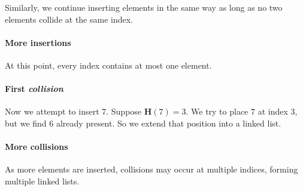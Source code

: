 \documentclass[11pt,openany]{book}
\begin{document}
Similarly, we continue inserting elements in the same way as long as no two elements collide at the same index.

\paragraph{More insertions}

\begin{center}
\end{center}

At this point, every index contains at most one element.

\paragraph{First \emph{collision}}

Now we attempt to insert \(7\). Suppose $\mathbf{H}(7)=3$.
We try to place \(7\) at index \(3\), but we find \(6\) already present.
So we extend that position into a linked list.

\begin{center}
\end{center}

\paragraph{More collisions}

As more elements are inserted, collisions may occur at multiple indices, forming multiple linked lists.
\end{document}
